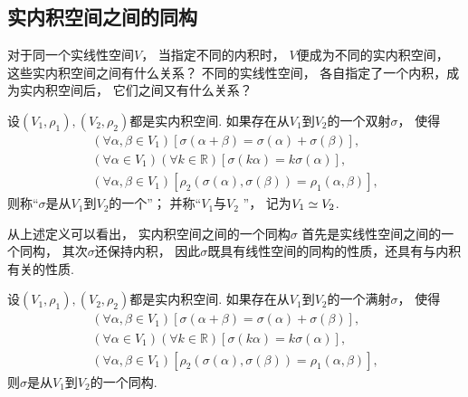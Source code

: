 \subsection{实内积空间之间的同构}
对于同一个实线性空间\(V\)，
当指定不同的内积时，
\(V\)便成为不同的实内积空间，
这些实内积空间之间有什么关系？
不同的实线性空间，
各自指定了一个内积，成为实内积空间后，
它们之间又有什么关系？

\begin{definition}
设\((V_1,\rho_1),(V_2,\rho_2)\)都是实内积空间.
如果存在从\(V_1\)到\(V_2\)的一个双射\(\sigma\)，
使得\begin{gather*}
	(\forall \alpha,\beta \in V_1)
	[
		\sigma(\alpha+\beta)
		= \sigma(\alpha) + \sigma(\beta)
	], \\
	(\forall \alpha \in V_1)
	(\forall k \in \mathbb{R})
	[
		\sigma(k\alpha)
		= k \sigma(\alpha)
	], \\
	(\forall \alpha,\beta \in V_1)
	[
		\rho_2(\sigma(\alpha),\sigma(\beta))
		= \rho_1(\alpha,\beta)
	],
\end{gather*}
则称“\(\sigma\)是从\(V_1\)到\(V_2\)的一个”；
并称“\(V_1\)与\(V_2\) ”，
记为\(V_1 \simeq V_2\).
\end{definition}
\begin{remark}
从上述定义可以看出，
实内积空间之间的一个同构\(\sigma\)
首先是实线性空间之间的一个同构，
其次\(\sigma\)还保持内积，
因此\(\sigma\)既具有线性空间的同构的性质，还具有与内积有关的性质.
\end{remark}

\begin{proposition}\label{theorem:欧几里得空间.实内积空间之间的同构的等价定义}
设\((V_1,\rho_1),(V_2,\rho_2)\)都是实内积空间.
如果存在从\(V_1\)到\(V_2\)的一个满射\(\sigma\)，
使得\begin{gather*}
	(\forall \alpha,\beta \in V_1)
	[
		\sigma(\alpha+\beta)
		= \sigma(\alpha) + \sigma(\beta)
	], \\
	(\forall \alpha \in V_1)
	(\forall k \in \mathbb{R})
	[
		\sigma(k\alpha)
		= k \sigma(\alpha)
	], \\
	(\forall \alpha,\beta \in V_1)
	[
		\rho_2(\sigma(\alpha),\sigma(\beta))
		= \rho_1(\alpha,\beta)
	],
\end{gather*}
则\(\sigma\)是从\(V_1\)到\(V_2\)的一个同构.
\end{proposition}

